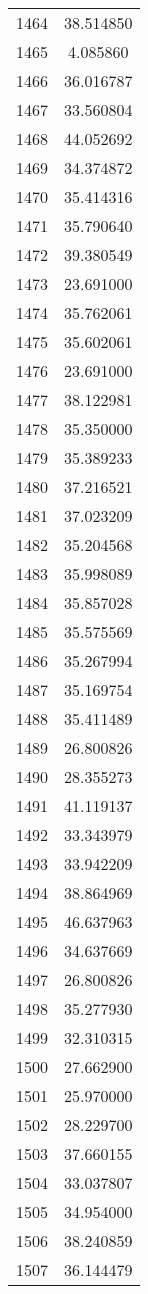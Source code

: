 \documentclass[12pt]{article}
\begin{document}
\begin{longtable}{@{}cc@{}}
1464 & 38.514850 \\
1465 & 4.085860 \\
1466 & 36.016787 \\
1467 & 33.560804 \\
1468 & 44.052692 \\
1469 & 34.374872 \\
1470 & 35.414316 \\
1471 & 35.790640 \\
1472 & 39.380549 \\
1473 & 23.691000 \\
1474 & 35.762061 \\
1475 & 35.602061 \\
1476 & 23.691000 \\
1477 & 38.122981 \\
1478 & 35.350000 \\
1479 & 35.389233 \\
1480 & 37.216521 \\
1481 & 37.023209 \\
1482 & 35.204568 \\
1483 & 35.998089 \\
1484 & 35.857028 \\
1485 & 35.575569 \\
1486 & 35.267994 \\
1487 & 35.169754 \\
1488 & 35.411489 \\
1489 & 26.800826 \\
1490 & 28.355273 \\
1491 & 41.119137 \\
1492 & 33.343979 \\
1493 & 33.942209 \\
1494 & 38.864969 \\
1495 & 46.637963 \\
1496 & 34.637669 \\
1497 & 26.800826 \\
1498 & 35.277930 \\
1499 & 32.310315 \\
1500 & 27.662900 \\
1501 & 25.970000 \\
1502 & 28.229700 \\
1503 & 37.660155 \\
1504 & 33.037807 \\
1505 & 34.954000 \\
1506 & 38.240859 \\
1507 & 36.144479 \\

\end{longtable}
\end{document}
